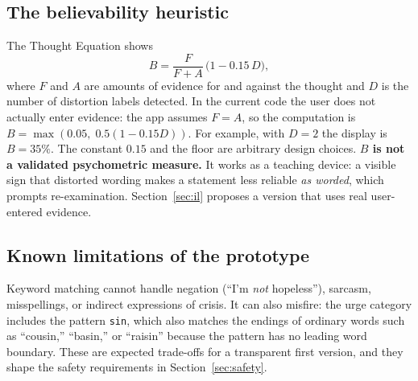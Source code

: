 \documentclass[11pt]{article}
\begin{document}
\subsection{The believability heuristic}
The Thought Equation shows
\begin{equation}
B = \frac{F}{F+A}\,\bigl(1 - 0.15\,D\bigr),
\label{eq:b}
\end{equation}
where $F$ and $A$ are amounts of evidence for and against the thought and $D$ is the number of distortion labels detected. In the current code the user does not actually enter evidence: the app assumes $F=A$, so the computation is $B=\max(0.05,\;0.5(1-0.15D))$. For example, with $D=2$ the display is $B=35\%$. The constant $0.15$ and the floor are arbitrary design choices. \textbf{$B$ is not a validated psychometric measure.} It works as a teaching device: a visible sign that distorted wording makes a statement less reliable \emph{as worded}, which prompts re-examination. Section~\ref{sec:il} proposes a version that uses real user-entered evidence.

\subsection{Known limitations of the prototype}
Keyword matching cannot handle negation (``I'm \emph{not} hopeless''), sarcasm, misspellings, or indirect expressions of crisis. It can also misfire: the urge category includes the pattern \texttt{sin}, which also matches the endings of ordinary words such as ``cousin,'' ``basin,'' or ``raisin'' because the pattern has no leading word boundary. These are expected trade-offs for a transparent first version, and they shape the safety requirements in Section~\ref{sec:safety}.
\end{document}
